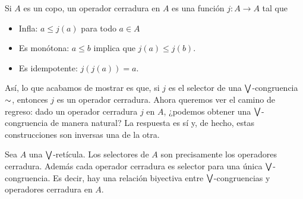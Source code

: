 \begin{defn}
  \label{def:operador-cerradura}
  Si $A$ es un copo, un operador cerradura en $A$ es una función
  $j:A\to A$ tal que
  \begin{itemize}
    \item Infla: $a\leq j(a)$ para todo $a\in A$
    \item Es monótona: $a\leq b$ implica que $j(a)\leq j(b)$.
    \item Es idempotente: $j(j(a))=a$.
  \end{itemize}
\end{defn}
Así, lo que acabamos de mostrar es que, si $j$ es el selector de
una $\bigvee$-congruencia ${\sim}$, entonces $j$ es un operador
cerradura.
Ahora queremos ver el camino de regreso: dado un operador
cerradura $j$ en $A$, ¿podemos obtener una $\bigvee$-congruencia de
manera natural? La respuesta es sí y, de hecho, estas
construcciones son inversas una de la otra.
\begin{lemma}%
  Sea $A$ una $\bigvee$-retícula. Los selectores de $A$ son
  precisamente los operadores cerradura. Además cada operador
  cerradura es selector para una única $\bigvee$-congruencia. Es
  decir, hay una relación biyectiva entre $\bigvee$-congruencias y
  operadores cerradura en $A$.
\end{lemma}
